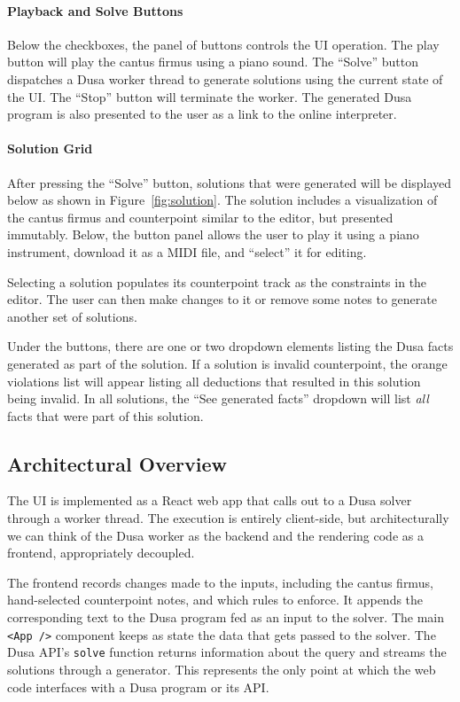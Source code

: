 \paragraph{Playback and Solve Buttons}
Below the checkboxes, the panel of buttons controls the UI operation. The play
button will play the cantus firmus using a piano sound. The ``Solve'' button
dispatches a Dusa worker thread to generate solutions using the current state of
the UI. The ``Stop'' button will terminate the worker. The generated Dusa
program is also presented to the user as a link to the online interpreter.

\paragraph{Solution Grid}
After pressing the ``Solve'' button, solutions that were generated will be
displayed below as shown in Figure~\ref{fig:solution}. The solution includes a
visualization of the cantus firmus and counterpoint similar to the editor, but
presented immutably. Below, the button panel allows the user to play it using a
piano instrument, download it as a MIDI file, and ``select'' it for editing.

Selecting a solution populates its counterpoint track as the constraints in the
editor. The user can then make changes to it or remove some notes to generate
another set of solutions.

Under the buttons, there are one or two dropdown elements listing the Dusa facts
generated as part of the solution. If a solution is invalid
counterpoint, the orange violations list will appear listing all deductions that
resulted in this solution being invalid. In all solutions, the ``See generated
facts'' dropdown will list {\em all} facts that were part of this solution.

\subsection{Architectural Overview}

The UI is implemented as a React web app that calls out to a Dusa solver through
a worker thread. The execution is entirely client-side, but
architecturally we can think of the Dusa worker as the backend and
the rendering code as a frontend, appropriately decoupled.

The frontend records changes made to the inputs, including
the cantus firmus, hand-selected counterpoint notes, and
which rules to enforce. It
appends the corresponding text to the Dusa program fed as an input to the
solver.
The main \verb|<App />| component
keeps as state the data that gets passed to the solver.
The Dusa API's \verb|solve| function returns information about the query and
streams the solutions through a generator. This represents the only
point at which the web code interfaces with a Dusa program or its API.

